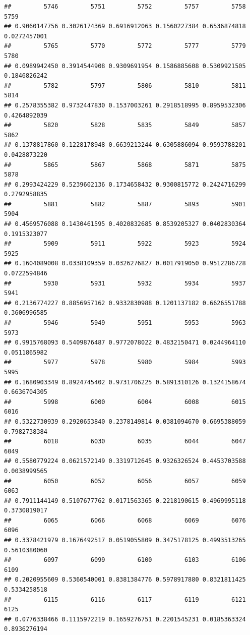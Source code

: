 \documentclass[
]{article}
\begin{document}
\begin{verbatim}
##         5746         5751         5752         5757         5758         5759 
## 0.9060147756 0.3026174369 0.6916912063 0.1560227384 0.6536874818 0.0272457001 
##         5765         5770         5772         5777         5779         5780 
## 0.0989942450 0.3914544908 0.9309691954 0.1586885608 0.5309921505 0.1846826242 
##         5782         5797         5806         5810         5811         5814 
## 0.2578355382 0.9732447830 0.1537003261 0.2918518995 0.8959532306 0.4264892039 
##         5820         5828         5835         5849         5857         5862 
## 0.1378817860 0.1228178948 0.6639213244 0.6305886094 0.9593788201 0.0428873220 
##         5865         5867         5868         5871         5875         5878 
## 0.2993424229 0.5239602136 0.1734658432 0.9300815772 0.2424716299 0.2792958835 
##         5881         5882         5887         5893         5901         5904 
## 0.4569576088 0.1430461595 0.4020832685 0.8539205327 0.0402830364 0.1915323077 
##         5909         5911         5922         5923         5924         5925 
## 0.1604089008 0.0338109359 0.0326276827 0.0017919050 0.9512286728 0.0722594846 
##         5930         5931         5932         5934         5937         5941 
## 0.2136774227 0.8856957162 0.9332830988 0.1201137182 0.6626551788 0.3606996585 
##         5946         5949         5951         5953         5963         5973 
## 0.9915768093 0.5409876487 0.9772078022 0.4832150471 0.0244964110 0.0511865982 
##         5977         5978         5980         5984         5993         5995 
## 0.1680903349 0.8924745402 0.9731706225 0.5891310126 0.1324158674 0.6636704305 
##         5998         6000         6004         6008         6015         6016 
## 0.5322730939 0.2920653840 0.2378149814 0.0381094670 0.6695388059 0.7982738384 
##         6018         6030         6035         6044         6047         6049 
## 0.5580779224 0.0621572149 0.3319712645 0.9326326524 0.4453703588 0.0038999565 
##         6050         6052         6056         6057         6059         6063 
## 0.7911144149 0.5107677762 0.0171563365 0.2218190615 0.4969995118 0.3730819017 
##         6065         6066         6068         6069         6076         6096 
## 0.3378421979 0.1676492517 0.0519055809 0.3475178125 0.4993513265 0.5610380060 
##         6097         6099         6100         6103         6106         6109 
## 0.2020955609 0.5360540001 0.8381384776 0.5978917880 0.8321811425 0.5334258518 
##         6115         6116         6117         6119         6121         6125 
## 0.0776338466 0.1115972219 0.1659276751 0.2201545231 0.0185363324 0.8936276194 

\end{verbatim}
\end{document}
